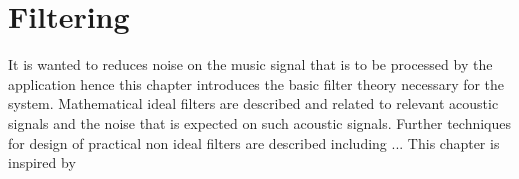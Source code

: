 \chapter{Filtering} \label{ch7}
It is wanted to reduces noise on the music signal that is to be processed by the application hence this chapter introduces the basic filter theory necessary for the system. Mathematical ideal filters are described and related to relevant acoustic signals and the noise that is expected on such acoustic signals. Further techniques for design of practical non ideal filters are described including ... This chapter is inspired by \cite{DTSP}      

